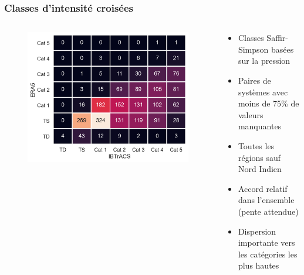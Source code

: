 \documentclass[aspectratio=169, usepdftitle=false, xcolor={dvipsnames}, 9pt,table]{beamer}
\begin{document}
 \begin{frame}
     \frametitle{Classes d'intensité croisées}
     \begin{columns}
         \begin{column}{0.5\textwidth}
             \vspace{1em}
             \begin{figure}
                 \centering
                 \includegraphics[width=\textwidth]{Figures/crosstable_global_myVTU.png}
             \end{figure}
         \end{column}
         \begin{column}{0.5\textwidth}
             \footnotesize
             \setlength{\leftmargini}{3.5ex}
             \begin{examples}[Méthodologie]
                 \begin{itemize}
                     \item Classes Saffir-Simpson basées sur la \alert{pression}\\\parencite{klotzbach_surface_2020}
                     \item Paires de systèmes avec moins de 75\% de valeurs manquantes
                     \item Toutes les régions sauf Nord Indien
                 \end{itemize}    
             \end{examples}
             \vspace{2em}
             \begin{block}
                \begin{itemize}
                     \item Accord relatif dans l'ensemble (pente attendue)
                     \item \alert{Dispersion importante} vers les catégories les plus hautes
                \end{itemize} 
             \end{block}
         \end{column}
     \end{columns} 
 \end{frame}
 
\end{document}
